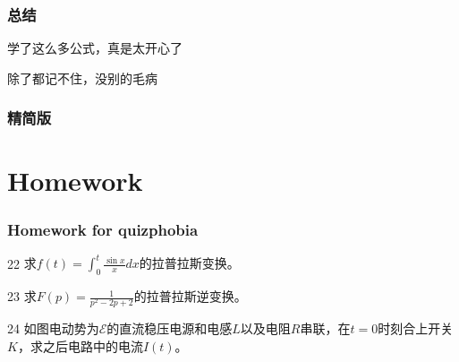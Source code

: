 \documentclass[CJK]{beamer}
\begin{document}
\begin{frame}
  \frametitle{总结}
  
  \bcenter
  学了这么多公式，真是太开心了


  除了都记不住，没别的毛病
  \ecenter
  
\end{frame}


\begin{frame}
  \frametitle{精简版}
  
  
  
\end{frame}


\section{Homework}

\begin{frame}
\frametitle{Homework for quizphobia}

\bitem
\item[22]{求$f(t) = \int_0^t \frac{\sin x}{x}dx$的拉普拉斯变换。}
\item[23]{求$F(p) = \frac{1}{p^2-2p+2}$的拉普拉斯逆变换。}
\item[24]{如图电动势为$\mathcal{E}$的直流稳压电源和电感$L$以及电阻$R$串联，在$t=0$时刻合上开关$K$，求之后电路中的电流$I(t)$。
}
  \eitem

\end{frame}


\ech
\end{document}
